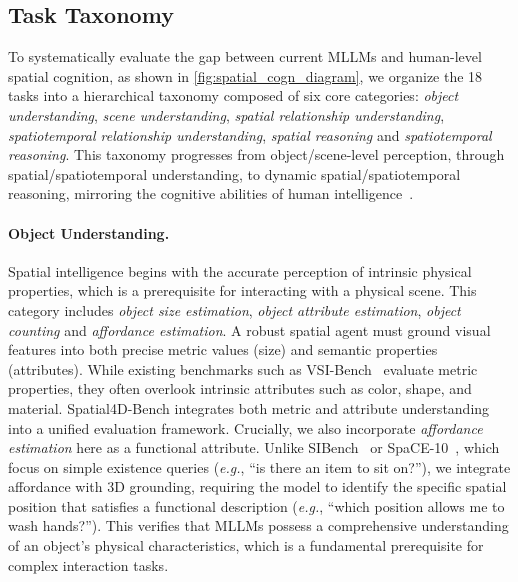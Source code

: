 \documentclass{article}
\newcommand{\eg}{\textit{e.g.}}
\begin{document}
\subsection{Task Taxonomy}
\label{subsec:taxonomy}

To systematically evaluate the gap between current MLLMs and human-level spatial cognition, as shown in \cref{fig:spatial_cogn_diagram}, we organize the 18 tasks into a hierarchical taxonomy composed of six core categories: \textit{object understanding}, \textit{scene understanding}, \textit{spatial relationship understanding}, \textit{spatiotemporal relationship understanding}, \textit{spatial reasoning} and \textit{spatiotemporal reasoning}. This taxonomy progresses from object/scene-level perception, through spatial/spatiotemporal understanding, to dynamic spatial/spatiotemporal reasoning, mirroring the cognitive abilities of human intelligence~\cite{waller2013handbook, newcombe2004spatial}.


\paragraph{Object Understanding.} Spatial intelligence begins with the accurate perception of intrinsic physical properties, which is a prerequisite for interacting with a physical scene.
This category includes \textit{object size estimation}, \textit{object attribute estimation},  \textit{object counting} and \textit{affordance estimation}. 
A robust spatial agent must ground visual features into both precise metric values (size) and semantic properties (attributes).
While existing benchmarks such as VSI-Bench~\cite{Yang_2025_CVPR} evaluate metric properties, they often overlook intrinsic attributes such as color, shape, and material.
Spatial4D-Bench integrates both metric and attribute understanding into a unified evaluation framework.
Crucially, we also incorporate \textit{affordance estimation} here as a functional attribute. 
Unlike SIBench~\cite{yu2025far} or SpaCE-10~\cite{gong2025space}, which focus on simple existence queries (\eg, ``is there an item to sit on?''), we integrate affordance with 3D grounding, requiring the model to identify the specific spatial position that satisfies a functional description (\eg, ``which position allows me to wash hands?''). 
This verifies that MLLMs possess a comprehensive understanding of an object's physical characteristics, which is a fundamental prerequisite for complex interaction tasks.
\end{document}
